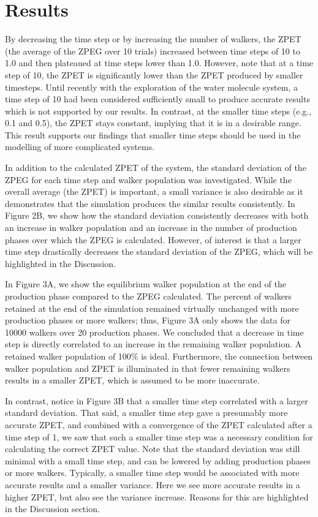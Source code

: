 \documentclass[journal=jacsat,manuscript=article]{achemso}
\begin{document}
\section{Results}
By decreasing the time step or by increasing the number of walkers, the ZPET (the average of the ZPEG over 10 trials) increased between time steps of 10 to 1.0 and then plateaued at time steps lower than 1.0. However, note that at a time step of 10, the ZPET is significantly lower than the ZPET produced by smaller timesteps. Until recently with the exploration of the water molecule system, a time step of 10 had been considered sufficiently small to produce accurate results which is not supported by our results. In contrast, at the smaller time steps (e.g., 0.1 and 0.5), the ZPET stays constant, implying that it is in a desirable range. This result supports our findings that smaller time steps should be used in the modelling of more complicated systems. 
	
In addition to the calculated ZPET of the system, the standard deviation of the ZPEG for each time step and walker population was investigated. While the overall average (the ZPET) is important, a small variance is also desirable as it demonstrates that the simulation produces the similar results consistently. In Figure 2B, we show how the standard deviation consistently decreases with both an increase in walker population and an increase in the number of production phases over which the ZPEG is calculated. However, of interest is that a larger time step drastically decreases the standard deviation of the ZPEG, which will be highlighted in the Discussion. 
	
In Figure 3A, we show the equilibrium walker population at the end of the production phase compared to the ZPEG calculated. The percent of walkers retained at the end of the simulation remained virtually unchanged with more production phases or more walkers; thus, Figure 3A only shows the data for 10000 walkers over 20 production phases. We concluded that a decrease in time step is directly correlated to an increase in the remaining walker population. A retained walker population of 100\% is ideal. Furthermore, the connection between walker population and ZPET is illuminated in that fewer remaining walkers results in a smaller ZPET, which is assumed to be more inaccurate. 
	
In contrast, notice in Figure 3B that a smaller time step correlated with a larger standard deviation. That said, a smaller time step gave a presumably more accurate ZPET, and combined with a convergence of the ZPET calculated after a time step of 1, we saw that such a smaller time step was a necessary condition for calculating the correct ZPET value. Note that the standard deviation was still minimal with a small time step, and can be lowered by adding production phases or more walkers. Typically, a smaller time step would be associated with more accurate results and a smaller variance. Here we see more accurate results in a higher ZPET, but also see the variance increase. Reasons for this are highlighted in the Discussion section.
\end{document}
